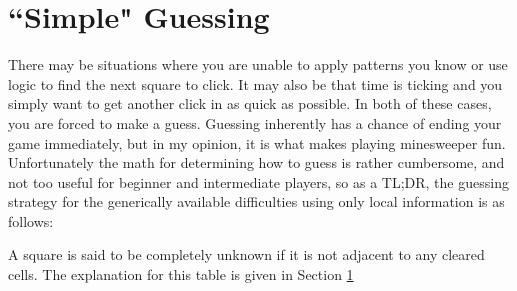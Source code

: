 \section{``Simple" Guessing}\label{sec:simple_guessing}
There may be situations where you are unable to apply patterns you know or use logic to find the next square to click. It may also be that time is ticking and you simply want to get another click in as quick as possible. In both of these cases, you are forced to make a guess. Guessing inherently has a chance of ending your game immediately, but in my opinion, it is what makes playing minesweeper fun.\\

Unfortunately the math for determining how to guess is rather cumbersome, and not too useful for beginner and intermediate players, so as a TL;DR, the guessing strategy for the generically available difficulties using only local information is as follows:


A square is said to be completely unknown if it is not adjacent to any cleared cells. The explanation for this table is given in Section \ref{sec:simple_guessing}